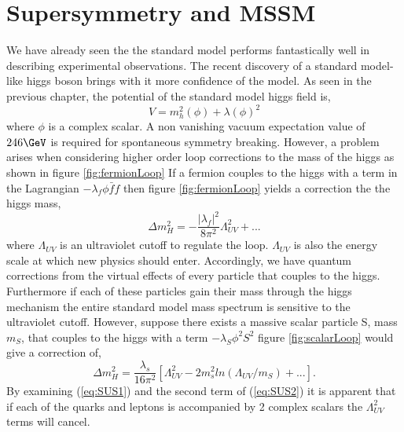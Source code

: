 \chapter{Supersymmetry and MSSM}
We have already seen the the standard model 
performs fantastically well in describing experimental observations. The
recent discovery of a standard model-like higgs boson brings with it
more confidence of the model. 
As seen in the previous chapter, the potential of the standard model higgs 
field is,
\begin{equation}
V=m_{h}^{2}(\phi)+\lambda(\phi)^{2}
\end{equation}
where $\phi$ is a complex scalar.
A non vanishing vacuum expectation 
value of $246 \GeV$ is required for spontaneous symmetry breaking.
However, a problem arises when 
considering higher order loop corrections to the mass of the higgs as shown in
figure \ref{fig:fermionLoop} 
If a fermion couples to the higgs with a term in the Lagrangian $-\lambda_{f}\phi \bar{f}f$
then figure \ref{fig:fermionLoop} 
yields a correction the the higgs mass,
\begin{equation}
\Delta m_{H}^{2}=-\frac{|\lambda_{f}|^{2}}{8\pi^{2}}\Lambda_{UV}^{2}+...
\label{eq:SUS1}
\end{equation}
where $\Lambda_{UV}$ is an ultraviolet cutoff to regulate the loop. $\Lambda_{UV}$
is also the energy scale at which new physics should enter.
Accordingly, we have quantum corrections from the virtual 
effects of every particle that couples to the higgs. Furthermore if each of these 
particles gain their mass through the higgs mechanism the entire standard model 
mass spectrum is sensitive to the ultraviolet cutoff.
However, suppose there exists a massive scalar particle S, mass $m_{S}$, that couples
to the higgs with a term $-\lambda_{S}\phi^{2} S^{2}$
figure \ref{fig:scalarLoop} would give a correction of,
\begin{equation}
\Delta m_{H}^{2}=\frac{\lambda_{s}}{16\pi^{2}}\left[\Lambda_{UV}^{2}-2m_{s}^{2}ln(\Lambda_{UV}/m_{S})+... \right].
\label{eq:SUS2}
\end{equation}
By examining (\ref{eq:SUS1}) and the second term of (\ref{eq:SUS2}) it is apparent that if each of the quarks
and leptons is accompanied by 2 complex scalars the $\Lambda_{UV}^{2}$ terms will cancel.

